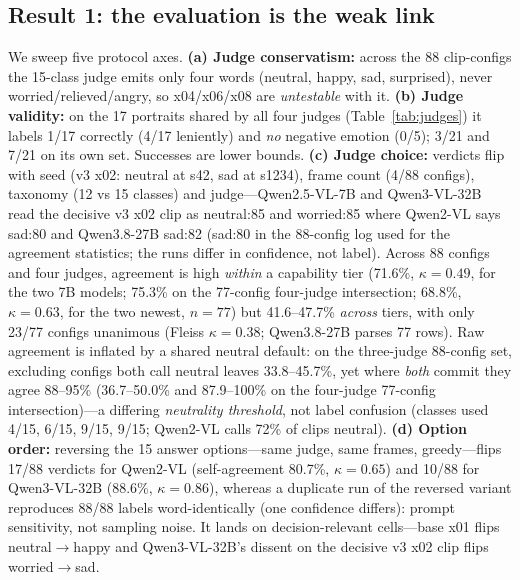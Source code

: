 \documentclass[conference]{IEEEtran}
\begin{document}
\subsection{Result 1: the evaluation is the weak link}
\label{sec:unstable}
We sweep five protocol axes. \textbf{(a) Judge conservatism:} across the 88 clip-configs the 15-class judge
emits only four words (neutral, happy, sad, surprised), never worried/relieved/angry, so x04/x06/x08 are
\emph{untestable} with it. \textbf{(b) Judge validity:} on the 17 portraits shared by all four
judges (Table~\ref{tab:judges}) it labels 1/17 correctly (4/17 leniently) and \emph{no} negative emotion
(0/5); 3/21 and 7/21 on its own set. Successes are lower bounds.
\textbf{(c) Judge choice:} verdicts flip with seed (v3 x02: neutral at s42, sad at s1234), frame count
(4/88 configs), taxonomy (12 vs 15 classes) and judge---Qwen2.5-VL-7B and Qwen3-VL-32B
\cite{qwen3vl2025} read the decisive v3 x02 clip as neutral:85 and worried:85 where Qwen2-VL says sad:80
and Qwen3.8-27B sad:82 (sad:80 in the 88-config log used for the agreement statistics; the
runs differ in confidence, not label). Across 88 configs and four judges, agreement is high \emph{within} a
capability tier (71.6\%, $\kappa{=}0.49$, for the two 7B models; 75.3\% on the 77-config four-judge
intersection; 68.8\%, $\kappa{=}0.63$, for the two newest, $n{=}77$) but 41.6--47.7\% \emph{across}
tiers, with only 23/77 configs unanimous (Fleiss $\kappa{=}0.38$; Qwen3.8-27B parses 77 rows). Raw
agreement is inflated by a shared neutral default: on the three-judge 88-config set, excluding configs both
call neutral leaves 33.8--45.7\%, yet where \emph{both} commit they agree 88--95\% (36.7--50.0\% and
87.9--100\% on the four-judge 77-config intersection)---a differing \emph{neutrality threshold}, not label
confusion (classes used 4/15, 6/15, 9/15, 9/15; Qwen2-VL calls 72\% of clips neutral). \textbf{(d) Option order:} reversing the 15 answer options---same judge, same
frames, greedy---flips 17/88 verdicts for Qwen2-VL (self-agreement 80.7\%, $\kappa{=}0.65$) and 10/88
for Qwen3-VL-32B (88.6\%, $\kappa{=}0.86$), whereas a duplicate run of the reversed variant reproduces 88/88
labels word-identically (one confidence differs): prompt sensitivity, not sampling noise. It lands on decision-relevant cells---base x01 flips
neutral$\rightarrow$happy and Qwen3-VL-32B's dissent on the decisive v3 x02 clip flips
worried$\rightarrow$sad.
\end{document}
